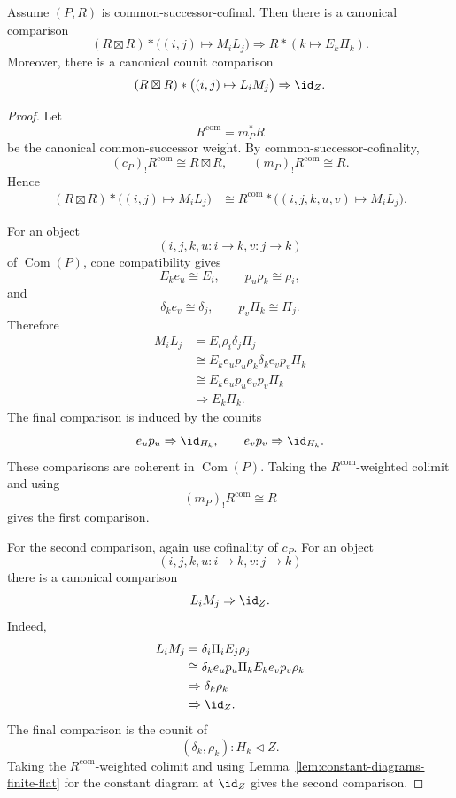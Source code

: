 \begin{lemma}
\label{lem:canonical-double-to-single-comparison}
Assume \((P,R)\) is common-successor-cofinal.  Then there is a canonical
comparison
\[
    (R\boxtimes R)*
    \bigl((i,j)\mapsto M_iL_j\bigr)
    \Rightarrow
    R*(k\mapsto E_k\Pi_k).
\]
Moreover, there is a canonical counit comparison
\[
    (R\boxtimes R)*
    \bigl((i,j)\mapsto L_iM_j\bigr)
    \Rightarrow
    \id_Z.
\]
\end{lemma}

\begin{proof}
Let
\[
    R^{\mathrm{com}}=m_P^*R
\]
be the canonical common-successor weight.  By common-successor-cofinality,
\[
    (c_P)_!R^{\mathrm{com}}\cong R\boxtimes R,
    \qquad
    (m_P)_!R^{\mathrm{com}}\cong R.
\]
Hence
\[
\begin{aligned}
    (R\boxtimes R)*
    \bigl((i,j)\mapsto M_iL_j\bigr)
    &\cong
    R^{\mathrm{com}}*
    \bigl((i,j,k,u,v)\mapsto M_iL_j\bigr).
\end{aligned}
\]

For an object
\[
    (i,j,k,u:i\to k,v:j\to k)
\]
of \(\operatorname{Com}(P)\), cone compatibility gives
\[
    E_k e_u\cong E_i,
    \qquad
    p_u\rho_k\cong \rho_i,
\]
and
\[
    \delta_k e_v\cong \delta_j,
    \qquad
    p_v\Pi_k\cong \Pi_j.
\]
Therefore
\[
\begin{aligned}
    M_iL_j
    &=
    E_i\rho_i\delta_j\Pi_j
    \\
    &\cong
    E_k e_u p_u\rho_k\delta_k e_vp_v\Pi_k
    \\
    &\cong
    E_k e_u p_u e_vp_v\Pi_k
    \\
    &\Rightarrow
    E_k\Pi_k.
\end{aligned}
\]
The final comparison is induced by the counits
\[
    e_up_u\Rightarrow \id_{H_k},
    \qquad
    e_vp_v\Rightarrow \id_{H_k}.
\]
These comparisons are coherent in \(\operatorname{Com}(P)\).  Taking the
\(R^{\mathrm{com}}\)-weighted colimit and using
\[
    (m_P)_!R^{\mathrm{com}}\cong R
\]
gives the first comparison.

For the second comparison, again use cofinality of \(c_P\).  For an object
\[
    (i,j,k,u:i\to k,v:j\to k)
\]
there is a canonical comparison
\[
    L_iM_j\Rightarrow \id_Z.
\]
Indeed,
\[
\begin{aligned}
    L_iM_j
    &=
    \delta_i\Pi_iE_j\rho_j
    \\
    &\cong
    \delta_k e_u p_u\Pi_kE_k e_vp_v\rho_k
    \\
    &\Rightarrow
    \delta_k\rho_k
    \\
    &\Rightarrow
    \id_Z.
\end{aligned}
\]
The final comparison is the counit of
\[
    (\delta_k,\rho_k):H_k\triangleleft Z.
\]
Taking the \(R^{\mathrm{com}}\)-weighted colimit and using
Lemma~\ref{lem:constant-diagrams-finite-flat} for the constant diagram at
\(\id_Z\) gives the second comparison.
\end{proof}

